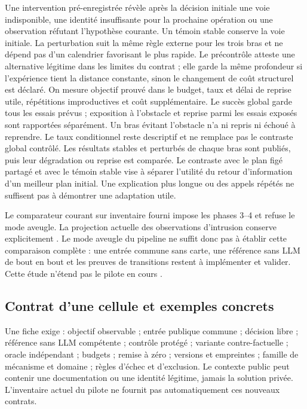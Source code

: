 \documentclass[11pt,a4paper]{article}
\newcommand{\code}[1]{{\small\ttfamily\path{#1}}}
\begin{document}
Une intervention pré-enregistrée révèle après la décision initiale une voie indisponible, une identité insuffisante pour la prochaine opération ou une observation réfutant l'hypothèse courante. Un témoin stable conserve la voie initiale. La perturbation suit la même règle externe pour les trois bras et ne dépend pas d'un calendrier favorisant le plus rapide. Le précontrôle atteste une alternative légitime dans les limites du contrat ; elle garde la même profondeur si l'expérience tient la distance constante, sinon le changement de coût structurel est déclaré. On mesure objectif prouvé dans le budget, taux et délai de reprise utile, répétitions improductives et coût supplémentaire. Le succès global garde tous les essais prévus ; exposition à l'obstacle et reprise parmi les essais exposés sont rapportées séparément. Un bras évitant l'obstacle n'a ni repris ni échoué à reprendre. Le taux conditionnel reste descriptif et ne remplace pas le contraste global contrôlé. Les résultats stables et perturbés de chaque bras sont publiés, puis leur dégradation ou reprise est comparée. Le contraste avec le plan figé partagé et avec le témoin stable vise à séparer l'utilité du retour d'information d'un meilleur plan initial. Une explication plus longue ou des appels répétés ne suffisent pas à démontrer une adaptation utile.

Le comparateur courant sur inventaire fourni impose les phases 3--4 et refuse le mode aveugle. La projection actuelle des observations d'intrusion conserve explicitement \code{transition_evidence_available: false}. Le mode aveugle du pipeline ne suffit donc pas à établir cette comparaison complète : une entrée commune sans carte, une référence sans LLM de bout en bout et les preuves de transitions restent à implémenter et valider. Cette étude n'étend pas le pilote en cours \cite{v2engine}.

\subsection{Contrat d'une cellule et exemples concrets}
\label{sec:contracts}
Une fiche exige : objectif observable ; entrée publique commune ; décision libre ; référence sans LLM compétente ; contrôle protégé ; variante contre-factuelle ; oracle indépendant ; budgets ; remise à zéro ; versions et empreintes ; famille de mécanisme et domaine ; règles d'échec et d'exclusion. Le contexte public peut contenir une documentation ou une identité légitime, jamais la solution privée. L'inventaire actuel du pilote ne fournit pas automatiquement ces nouveaux contrats.
\end{document}
